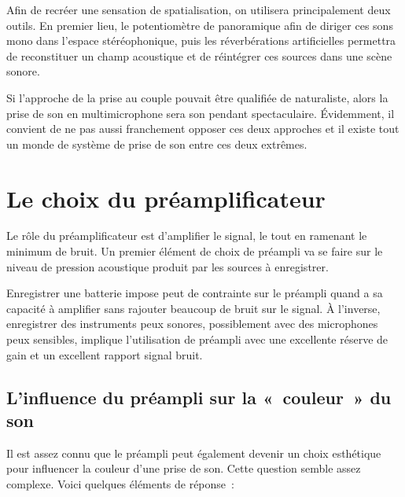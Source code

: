 \documentclass[
]{book}
\begin{document}
Afin de recréer une sensation de spatialisation, on utilisera principalement deux outils. En premier lieu, le potentiomètre de panoramique afin de diriger ces sons mono dans l'espace stéréophonique, puis les réverbérations artificielles permettra de reconstituer un champ acoustique et de réintégrer ces sources dans une scène sonore.

Si l'approche de la prise au couple pouvait être qualifiée de naturaliste, alors la prise de son en multimicrophone sera son pendant spectaculaire. Évidemment, il convient de ne pas aussi franchement opposer ces deux approches et il existe tout un monde de système de prise de son entre ces deux extrêmes.

\hypertarget{le-choix-du-pruxe9amplificateur}{%
\section{Le choix du préamplificateur}\label{le-choix-du-pruxe9amplificateur}}

Le rôle du préamplificateur est d'amplifier le signal, le tout en ramenant le minimum de bruit. Un premier élément de choix de préampli va se faire sur le niveau de pression acoustique produit par les sources à enregistrer.

Enregistrer une batterie impose peut de contrainte sur le préampli quand a sa capacité à amplifier sans rajouter beaucoup de bruit sur le signal. À l'inverse, enregistrer des instruments peux sonores, possiblement avec des microphones peux sensibles, implique l'utilisation de préampli avec une excellente réserve de gain et un excellent rapport signal bruit.

\hypertarget{linfluence-du-pruxe9ampli-sur-la-couleur-du-son}{%
\subsection{L'influence du préampli sur la «~couleur~» du son}\label{linfluence-du-pruxe9ampli-sur-la-couleur-du-son}}

Il est assez connu que le préampli peut également devenir un choix esthétique pour influencer la couleur d'une prise de son. Cette question semble assez complexe. Voici quelques éléments de réponse~:
\end{document}
